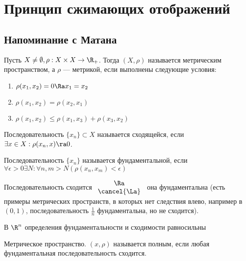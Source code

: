 
\section{Принцип сжимающих отображений}
\subsection{Напоминание с Матана}
\begin{definition}
    Пусть \(X \ne \emptyset, \rho: X \times X \rightarrow \R_+\). Тогда \((X, \rho)\) называется метрическим пространством, а \(\rho\) --- метрикой, если выполнены следующие условия:
    \begin{enumerate}
        \item \(\rho(x_1, x_2) = 0 \Ra x_1 = x_2\)
        \item \(\rho(x_1, x_2) = \rho(x_2, x_1)\)
        \item \(\rho(x_1, x_2) \le \rho(x_1, x_3) + \rho(x_3, x_2)\)
    \end{enumerate}
\end{definition}

\begin{definition}
	Последовательность \(\{x_n\} \subset X\) называется сходящейся, если \(\exists x \in X: \rho(x_n, x) \ra 0\).
\end{definition}

\begin{definition}
	Последовательность \(\{x_n\}\) называется фундаментальной, если \(\forall \epsilon > 0 \exists N: \forall n, m > N (\rho(x_n, x_m) < \epsilon)\)
\end{definition}

\begin{note}
	Последовательность сходится \(\begin{array}{c}
		\Ra \\
		\cancel{\La}
	\end{array}\) она фундаментальна (есть примеры метрических пространств, в которых нет следствия влево, например в \((0, 1)\), последовательность \(\frac{1}{n}\) фундаментальна, но не сходится).
\end{note}
\begin{note}
	В \(\R^n\) определения фундаментальности и сходимости равносильны
\end{note}

\begin{definition}
	Метрическое пространство. \((x, \rho)\) называется полным, если любая фундаментальная последовательность сходится.
\end{definition}

